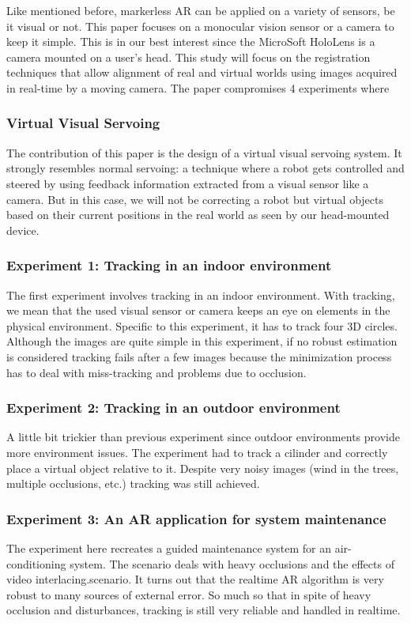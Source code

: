 \documentclass{article}
\begin{document}
Like mentioned before, markerless AR can be applied on a variety of sensors, be it visual or not. This paper focuses on a monocular vision sensor or a camera to keep it simple. This is in our best interest since the MicroSoft HoloLens is a camera mounted on a user's head.
This study will focus on the registration techniques that allow alignment of real and virtual worlds using images acquired in real-time by a moving camera. The paper compromises 4 experiments where 

\subsubsection{Virtual Visual Servoing}
The contribution of this paper is the design of a virtual visual servoing system. It strongly resembles normal servoing: a technique where a robot gets controlled and steered by using feedback information extracted from a visual sensor like a camera. But in this case, we will not be correcting a robot but virtual objects based on their current positions in the real world as seen by our head-mounted device.

\subsubsection{Experiment 1: Tracking in an indoor environment}
The first experiment involves tracking in an indoor environment. With tracking, we mean that the used visual sensor or camera keeps an eye on elements in the physical environment. Specific to this experiment, it has to track four 3D circles. Although the images are quite simple in this experiment, if no robust estimation is considered tracking fails after a few images because
the minimization process has to deal with miss-tracking and problems due to occlusion.

\subsubsection{Experiment 2: Tracking in an outdoor environment}
A little bit trickier than previous experiment since outdoor environments provide more environment issues. The experiment had to track a cilinder and correctly place a virtual object relative to it. Despite very noisy images (wind in the trees, multiple occlusions, etc.) tracking was still achieved.

\subsubsection{Experiment 3: An AR application for system maintenance}
The experiment here recreates a guided maintenance system for an air-conditioning system. The scenario deals with heavy occlusions and the effects of video interlacing.scenario. It turns out that the realtime AR algorithm is very robust to many sources of external error. So much so that in spite of heavy occlusion and disturbances, tracking is still very reliable and handled in realtime.
\end{document}
